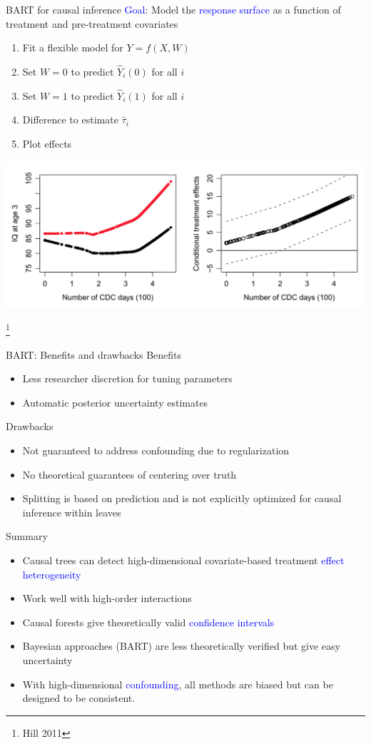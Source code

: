 \documentclass{beamer}
\newcommand{\myfootnote}{\let\thefootnote\relax\footnote}
\newcommand{\blue}[1]{\textcolor{blue}{#1}}
\begin{document}
\begin{frame}{BART for causal inference}
\blue{Goal}: Model the \blue{response surface} as a function of treatment and pre-treatment covariates
\begin{enumerate}
\item Fit a flexible model for $Y = f(X,W)$
\item Set $W = 0$ to predict $\hat{Y}_i(0)$ for all $i$
\item Set $W = 1$ to predict $\hat{Y}_i(1)$ for all $i$
\item Difference to estimate $\hat\tau_i$
\item Plot effects
\end{enumerate}
\begin{center}
\includegraphics[width = .7\textwidth]{figures/HillFigure}
\end{center}
\myfootnote{Hill 2011}
\end{frame}

\begin{frame}{BART: Benefits and drawbacks}
Benefits
\begin{itemize}
\item Less researcher discretion for tuning parameters
\item Automatic posterior uncertainty estimates
\end{itemize}
Drawbacks
\begin{itemize}
\item Not guaranteed to address confounding due to regularization
\item No theoretical guarantees of centering over truth
\item Splitting is based on prediction and is not explicitly optimized for causal inference within leaves
\end{itemize}
\end{frame}

\begin{frame}{Summary}
\begin{itemize}
\item Causal trees can detect high-dimensional covariate-based treatment \blue{effect heterogeneity}
\item Work well with high-order interactions
\item Causal forests give theoretically valid \blue{confidence intervals}
\item Bayesian approaches (BART) are less theoretically verified but give easy uncertainty
\item With high-dimensional \blue{confounding}, all methods are biased but can be designed to be consistent.
\end{itemize}
\end{frame}
\end{document}
